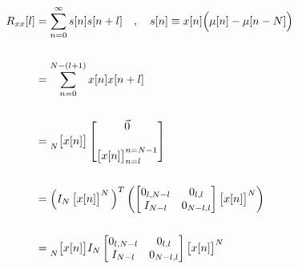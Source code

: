 \documentclass{article}
\begin{document}
\begin{align*}
    R_{xx}[l]&= \sum_{n = 0}^{\infty}s[n]s[n + l] \quad, \quad s[n] \equiv x[n]\Big(\mu[n] - \mu[n - N]\Big) \\ \\
             &= \sum_{n = 0}^{N - (l + 1)}x[n]x[n + l] \\ \\
             &= \prescript{}{N}{\begin{bmatrix} x[n] \end{bmatrix}}
                \begin{bmatrix}
                    \vec{0} \\ \\
                    \begin{bmatrix} x[n] \end{bmatrix}^{n = N - 1}_{n = l}
                  \end{bmatrix} \\ \\
             &= \Big( I_{N}\begin{bmatrix} x[n] \end{bmatrix}^{N} \Big)^{T}
                \begin{pmatrix}
                    \begin{bmatrix}
                        0_{l, N - l} & 0_{    l, l} \\
                        I_{   N - l} & 0_{N - l, l}
                      \end{bmatrix}\begin{bmatrix} x[n] \end{bmatrix}^{N}
                  \end{pmatrix} \\ \\
             &=\prescript{}{N}{\begin{bmatrix} x[n] \end{bmatrix}}I_{N}\begin{bmatrix}
                                                                            0_{l, N - l} & 0_{    l, l} \\
                                                                            I_{   N - l} & 0_{N - l, l}
                                                                         \end{bmatrix}\begin{bmatrix} x[n] \end{bmatrix}^{N} \\ \\

\end{align*}
\end{document}
